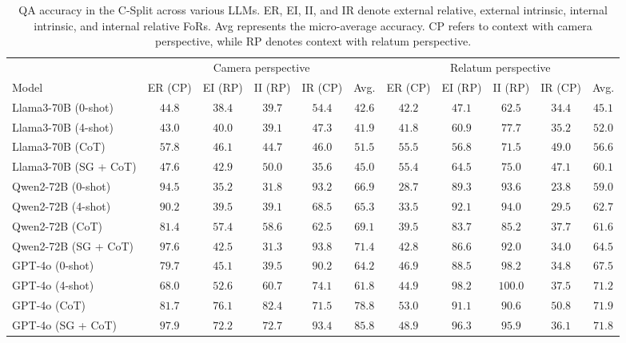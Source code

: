 \begin{table*}[ht!]
    \small
    \setlength{\tabcolsep}{1mm}
    \centering
    \begin{tabular}{|l|c|c|c|c|c||c|c|c|c|c|}
    \hline
     & \multicolumn{5}{|c||}{Camera perspective} & \multicolumn{5}{|c|}{Relatum perspective} \\
    \cline{2 - 11}
    Model & ER (CP) & EI (RP) & II (RP) & IR (CP) & Avg. & ER (CP) & EI (RP) & II (RP) & IR (CP) & Avg. \\
    \hline
     Llama3-70B (0-shot) & $44.8$ & $38.4$ & $39.7$ & $54.4$ & $42.6$ &$42.2$ & $47.1$ & $62.5$ & $34.4$ & $45.1$ \\
     Llama3-70B (4-shot) & $43.0$ & $40.0$ & $39.1$ & $47.3$ & $41.9$ & $41.8$ & $60.9$ & $77.7$ & $35.2$ & $52.0$ \\
     Llama3-70B (CoT) & $57.8$ & $46.1$ & $44.7$ & $46.0$ & $51.5$ & $\mathbf{55.5}$ & $56.8$ & $71.5$ & $49.0$ & $56.6$ \\
     Llama3-70B (SG + CoT) & $47.6$ & $42.9$ & $50.0$ & $35.6$ & $45.0$ &$55.4$ & $64.5$ & $75.0$ & $47.1$ & $60.1$ \\
     \hline
     Qwen2-72B (0-shot) & $94.5$ & $35.2$ & $31.8$ & $93.2$ & $66.9$ & $28.7$ & $89.3$ & $93.6$ & $23.8$ & $59.0$ \\
     Qwen2-72B (4-shot) & $90.2$ & $39.5$ & $39.1$ & $68.5$ & $65.3$ & $33.5$ & $92.1$ & $94.0$ & $29.5$ & $62.7$ \\
     Qwen2-72B (CoT) & $81.4$ & $57.4$ & $58.6$ & $62.5$ & $69.1$ & $39.5$ & $83.7$ & $85.2$ & $37.7$ & $61.6$ \\
     Qwen2-72B (SG + CoT) & $97.6$ & $42.5$ & $31.3$ & $93.8$ & $71.4$ & $42.8$ & $86.6$ & $92.0$ & $34.0$ & $64.5$ \\
     \hline
    GPT-4o (0-shot)  & $79.7$ & $45.1$ & $39.5$ & $90.2$ & $64.2$  & $46.9$ & $88.5$ & $98.2$ & $34.8$ & $67.5$ \\
    GPT-4o (4-shot) & $68.0$ & $52.6$ & $60.7$ & $74.1$ & $61.8$  & $44.9$ & $\mathbf{98.2}$ & $\mathbf{100.0}$ & $37.5$ & $71.2$ \\
    GPT-4o (CoT) & $81.7$ & $\mathbf{76.1}$ & $\mathbf{82.4}$ & $71.5$ & $78.8$  & $53.0$ & $91.1$ & $90.6$ & $\mathbf{50.8}$ & $71.9$ \\
    GPT-4o (SG + CoT)  & $\mathbf{97.9}$ & $72.2$ & $72.7$ & $\mathbf{93.4}$ & $\mathbf{85.8}$  & $48.9$ & $96.3$ & $95.9$ & $36.1$ & $\mathbf{71.8}$ \\
\hline
    \end{tabular}
    \caption{QA accuracy in the C-Split across various LLMs. ER, EI, II, and IR  denote external relative, external intrinsic, internal intrinsic, and internal relative FoRs. Avg represents the micro-average accuracy. CP refers to context with camera perspective, while RP denotes context with relatum perspective.}
    \label{tab:QA_c_split}
\end{table*}

